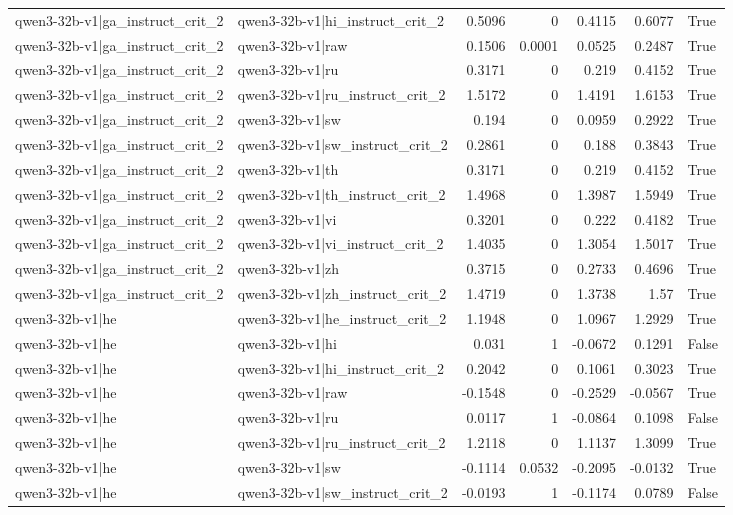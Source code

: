 \begin{table}
\begin{tabular}{l l r r r r l}
qwen3-32b-v1|ga_instruct_crit_2 & qwen3-32b-v1|hi_instruct_crit_2 & 0.5096 & 0 & 0.4115 & 0.6077 & True \\
qwen3-32b-v1|ga_instruct_crit_2 & qwen3-32b-v1|raw & 0.1506 & 0.0001 & 0.0525 & 0.2487 & True \\
qwen3-32b-v1|ga_instruct_crit_2 & qwen3-32b-v1|ru & 0.3171 & 0 & 0.219 & 0.4152 & True \\
qwen3-32b-v1|ga_instruct_crit_2 & qwen3-32b-v1|ru_instruct_crit_2 & 1.5172 & 0 & 1.4191 & 1.6153 & True \\
qwen3-32b-v1|ga_instruct_crit_2 & qwen3-32b-v1|sw & 0.194 & 0 & 0.0959 & 0.2922 & True \\
qwen3-32b-v1|ga_instruct_crit_2 & qwen3-32b-v1|sw_instruct_crit_2 & 0.2861 & 0 & 0.188 & 0.3843 & True \\
qwen3-32b-v1|ga_instruct_crit_2 & qwen3-32b-v1|th & 0.3171 & 0 & 0.219 & 0.4152 & True \\
qwen3-32b-v1|ga_instruct_crit_2 & qwen3-32b-v1|th_instruct_crit_2 & 1.4968 & 0 & 1.3987 & 1.5949 & True \\
qwen3-32b-v1|ga_instruct_crit_2 & qwen3-32b-v1|vi & 0.3201 & 0 & 0.222 & 0.4182 & True \\
qwen3-32b-v1|ga_instruct_crit_2 & qwen3-32b-v1|vi_instruct_crit_2 & 1.4035 & 0 & 1.3054 & 1.5017 & True \\
qwen3-32b-v1|ga_instruct_crit_2 & qwen3-32b-v1|zh & 0.3715 & 0 & 0.2733 & 0.4696 & True \\
qwen3-32b-v1|ga_instruct_crit_2 & qwen3-32b-v1|zh_instruct_crit_2 & 1.4719 & 0 & 1.3738 & 1.57 & True \\
qwen3-32b-v1|he & qwen3-32b-v1|he_instruct_crit_2 & 1.1948 & 0 & 1.0967 & 1.2929 & True \\
qwen3-32b-v1|he & qwen3-32b-v1|hi & 0.031 & 1 & -0.0672 & 0.1291 & False \\
qwen3-32b-v1|he & qwen3-32b-v1|hi_instruct_crit_2 & 0.2042 & 0 & 0.1061 & 0.3023 & True \\
qwen3-32b-v1|he & qwen3-32b-v1|raw & -0.1548 & 0 & -0.2529 & -0.0567 & True \\
qwen3-32b-v1|he & qwen3-32b-v1|ru & 0.0117 & 1 & -0.0864 & 0.1098 & False \\
qwen3-32b-v1|he & qwen3-32b-v1|ru_instruct_crit_2 & 1.2118 & 0 & 1.1137 & 1.3099 & True \\
qwen3-32b-v1|he & qwen3-32b-v1|sw & -0.1114 & 0.0532 & -0.2095 & -0.0132 & True \\
qwen3-32b-v1|he & qwen3-32b-v1|sw_instruct_crit_2 & -0.0193 & 1 & -0.1174 & 0.0789 & False \\

\end{tabular}
\end{table}
